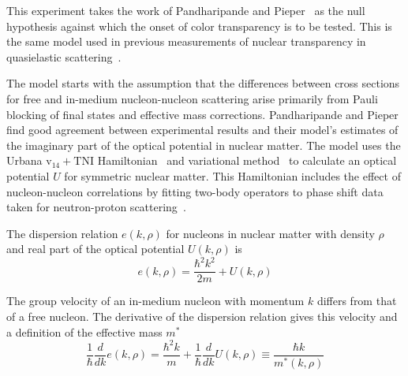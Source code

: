 This experiment takes the work of Pandharipande and
Pieper~\cite{Pandharipande_1992} as the null hypothesis against which the onset
of color transparency is to be tested.
This is the same model used in previous measurements of nuclear transparency
in quasielastic
scattering~\cite{Garrow_2002,Abbot_1998,Rohe_2005,Garino_1992}.

The model starts with the assumption that the differences between cross
sections for free and in-medium nucleon-nucleon scattering arise primarily from
Pauli blocking of final states and effective mass corrections.
Pandharipande and Pieper find good agreement between experimental results and
their model's estimates of the imaginary part of the optical potential in
nuclear matter.
The model uses the
Urbana $\text{v}_{14}+\text{TNI}$ Hamiltonian~\cite{Lagaris_1981_331, Lagaris_1981_349}
and variational method~\cite{Wiringa_1988, Friedman_1981}
to calculate an optical potential $U$ for symmetric nuclear matter.
This Hamiltonian includes the effect of nucleon-nucleon correlations by fitting
two-body operators to phase shift data taken for neutron-proton
scattering~\cite{Arndt_1977}.


The dispersion relation $e(k,\rho)$ for nucleons in nuclear matter with density
$\rho$ and real part of the optical potential $U(k,\rho)$ is
\begin{equation}
    e(k,\rho) = \frac{\hbar^2 k^2}{2m} + U(k,\rho)
\end{equation}

The group velocity of an in-medium nucleon with momentum $k$ differs from that of a
free nucleon.
The derivative of the dispersion relation gives this velocity and a
definition of the effective mass $m^*$
\begin{equation}
    \frac{1}{\hbar}\frac{d}{dk}e(k,\rho)
        = \frac{\hbar^2 k}{m} + \frac{1}{\hbar}\frac{d}{dk}U(k,\rho)
        \equiv \frac{\hbar k}{m^*(k,\rho)}
\end{equation}

